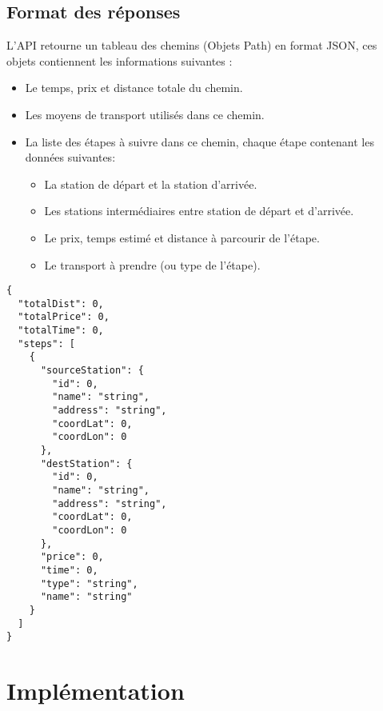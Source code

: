 	\subsection{Format des réponses}
	\label{ref:formatReponse}
	L'API retourne un tableau des chemins (Objets Path) en format JSON, ces objets contiennent les informations suivantes :
	\begin{itemize}
	\item Le temps, prix et distance totale du chemin.
	\item Les moyens de transport utilisés dans ce chemin.
	\item La liste des étapes à suivre dans ce chemin, chaque étape contenant les données suivantes:
	\begin{itemize}
		\item La station de départ et la station d'arrivée.
		\item Les stations intermédiaires entre station de départ et d'arrivée.
		\item Le prix, temps estimé et distance à parcourir de l'étape.
		\item Le transport à prendre (ou type de l'étape).
	\end{itemize}
	\end{itemize}
\begin{lstlisting}[caption=Format JSON de Path (chemin)]
{
  "totalDist": 0,
  "totalPrice": 0,
  "totalTime": 0,
  "steps": [
    {
      "sourceStation": {
        "id": 0,
        "name": "string",
        "address": "string",
        "coordLat": 0,
        "coordLon": 0
      },
      "destStation": {
        "id": 0,
        "name": "string",
        "address": "string",
        "coordLat": 0,
        "coordLon": 0
      },
      "price": 0,
      "time": 0,
      "type": "string",
      "name": "string"
    }
  ]
}
\end{lstlisting}

\section{Implémentation}
\label{ref:Implementation}
